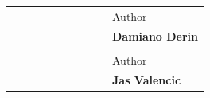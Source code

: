 \begin{titlepage}
\begin{center}
    \vfill
    \begin{table}[h]
        {\large
            \begin{tabular}{c c c c r c c | c c l}
                & & & & & & & & & Author \\
                & & & & & & & & & \bfseries Damiano Derin \\
                & & & & & & & & & \\
                & & & & & & & & & Author \\
                & & & & & & & & & \bfseries Jas Valencic \\
            \end{tabular}
        }
    \end{table}
    \vspace{1cm}
    \end{center}
\end{titlepage}

